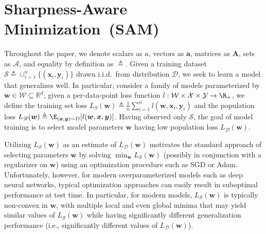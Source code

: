 \documentclass{article} %
\begin{document}
\section{Sharpness-Aware Minimization~(SAM)}
Throughout the paper, we denote scalars as $a$, vectors as $\boldsymbol{a}$, matrices as $\boldsymbol{A}$, sets as $\mathcal{A}$, and equality by definition as $\triangleq$.  Given a training dataset $\mathcal{S} \triangleq \cup_{i=1}^n \{(\boldsymbol{x}_i, \boldsymbol{y}_i)\}$ drawn i.i.d.~from distribution $\mathscr{D}$, we seek to learn a model that generalizes well.  In particular, consider a family of models parameterized by $\boldsymbol{w} \in \mathcal{W} \subseteq \mathbb{R}^d$; given a per-data-point loss function $l: \mathcal{W} \times \mathcal{X} \times \mathcal{Y} \rightarrow \R_+$, we define the training set loss $L_S(\boldsymbol{w}) \triangleq \frac{1}{n} \sum_{i=1}^n l(\boldsymbol{w}, \boldsymbol{x}_i, \boldsymbol{y}_i)$ and the population loss $L_\mathscr{D}(\boldsymbol{w}) \triangleq \E_{(\boldsymbol{x}, \boldsymbol{y}) \sim D} [l(\boldsymbol{w}, \boldsymbol{x}, \boldsymbol{y})]$. Having observed only $\mathcal{S}$, the goal of model training is to select model parameters $\boldsymbol{w}$ having low population loss $L_\mathscr{D}(\boldsymbol{w})$.

Utilizing $L_\mathcal{S}(\boldsymbol{w})$ as an estimate of $L_\mathscr{D}(\boldsymbol{w})$ motivates the standard approach of selecting parameters $\boldsymbol{w}$ by solving $\min_{\boldsymbol{w}} L_\mathcal{S}(\boldsymbol{w})$ (possibly in conjunction with a regularizer on $\boldsymbol{w}$) using an optimization procedure such as SGD or Adam.  Unfortunately, however, for modern overparameterized models such as deep neural networks, typical optimization approaches
can easily result in suboptimal performance at test time.  In particular, for modern models, $L_\mathcal{S}(\boldsymbol{w})$ is typically non-convex in $\boldsymbol{w}$, with multiple local and even global minima that may yield similar values of $L_\mathcal{S}(\boldsymbol{w})$ while having significantly different generalization performance (i.e., significantly different values of $L_\mathscr{D}(\boldsymbol{w})$).
\end{document}

